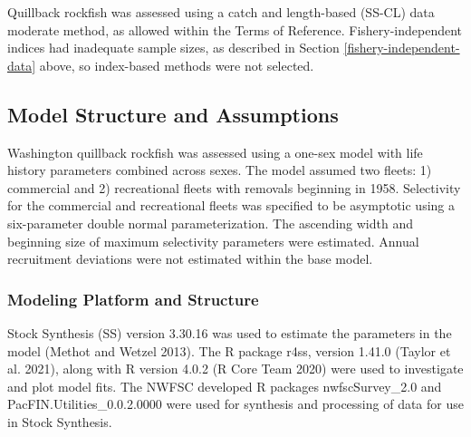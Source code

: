 \documentclass[11pt,
  english,
  letterpaper,
]{article}
\begin{document}
\leavevmode\tagmcend\tagstructend


Quillback rockfish was assessed using a catch and length-based (SS-CL) data moderate method, as allowed within the Terms of Reference. Fishery-independent indices had inadequate sample sizes, as described in Section \ref{fishery-independent-data} above, so index-based methods were not selected.

\leavevmode\tagmcend\tagstructend\par


\hypertarget{model-structure-and-assumptions}{%
\subsection{Model Structure and Assumptions}\label{model-structure-and-assumptions}}

\leavevmode\tagmcend\tagstructend


Washington quillback rockfish was assessed using a one-sex model with life history parameters combined across sexes. The model assumed two fleets: 1) commercial and 2) recreational fleets with removals beginning in 1958. Selectivity for the commercial and recreational fleets was specified to be asymptotic using a six-parameter double normal parameterization. The ascending width and beginning size of maximum selectivity parameters were estimated. Annual recruitment deviations were not estimated within the base model.

\leavevmode\tagmcend\tagstructend\par


\hypertarget{modeling-platform-and-structure}{%
\subsubsection{Modeling Platform and Structure}\label{modeling-platform-and-structure}}

\leavevmode\tagmcend\tagstructend


Stock Synthesis (SS) version 3.30.16 was used to estimate the parameters in the model {(Methot and Wetzel 2013)\leavevmode\tagmcend\tagstructend}. The R package r4ss, version 1.41.0 {(Taylor et al. 2021)\leavevmode\tagmcend\tagstructend}, along with R version 4.0.2 {(R Core Team 2020)\leavevmode\tagmcend\tagstructend} were used to investigate and plot model fits. The NWFSC developed R packages nwfscSurvey\_2.0 and PacFIN.Utilities\_0.0.2.0000 were used for synthesis and processing of data for use in Stock Synthesis.
\end{document}
